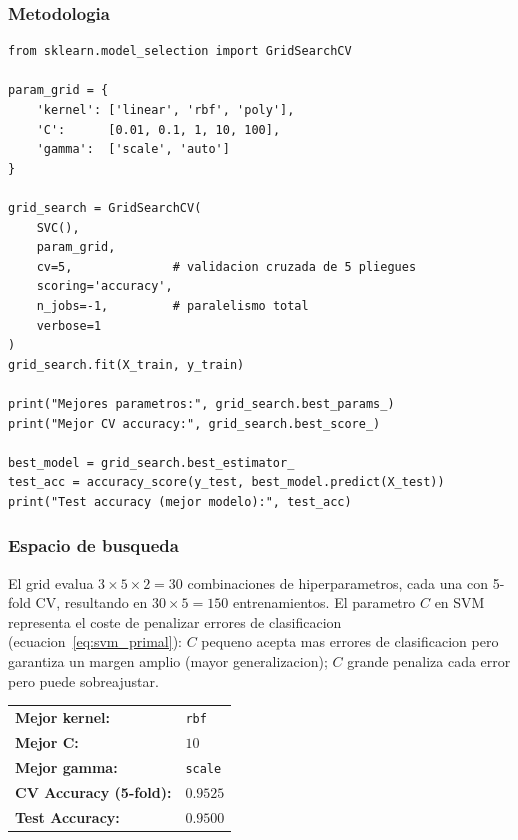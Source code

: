 \documentclass[12pt,a4paper]{article}
\begin{document}
\subsubsection*{Metodologia}

\begin{lstlisting}[caption={GridSearchCV para SVM}]
from sklearn.model_selection import GridSearchCV

param_grid = {
    'kernel': ['linear', 'rbf', 'poly'],
    'C':      [0.01, 0.1, 1, 10, 100],
    'gamma':  ['scale', 'auto']
}

grid_search = GridSearchCV(
    SVC(),
    param_grid,
    cv=5,              # validacion cruzada de 5 pliegues
    scoring='accuracy',
    n_jobs=-1,         # paralelismo total
    verbose=1
)
grid_search.fit(X_train, y_train)

print("Mejores parametros:", grid_search.best_params_)
print("Mejor CV accuracy:", grid_search.best_score_)

best_model = grid_search.best_estimator_
test_acc = accuracy_score(y_test, best_model.predict(X_test))
print("Test accuracy (mejor modelo):", test_acc)
\end{lstlisting}

\subsubsection*{Espacio de busqueda}

El grid evalua $3 \times 5 \times 2 = 30$ combinaciones de hiperparametros, cada una con 5-fold
CV, resultando en $30 \times 5 = 150$ entrenamientos. El parametro $C$ en SVM representa el
coste de penalizar errores de clasificacion (ecuacion~\ref{eq:svm_primal}): $C$ pequeno acepta
mas errores de clasificacion pero garantiza un margen amplio (mayor generalizacion); $C$ grande
penaliza cada error pero puede sobreajustar.

\begin{tcolorbox}[resultbox]
  \begin{tabular}{ll}
    \textbf{Mejor kernel:}   & \texttt{rbf}    \\[3pt]
    \textbf{Mejor C:}        & $10$            \\[3pt]
    \textbf{Mejor gamma:}    & \texttt{scale}  \\[3pt]
    \textbf{CV Accuracy (5-fold):} & $0.9525$   \\[3pt]
    \textbf{Test Accuracy:}  & $0.9500$        \\
  \end{tabular}
\end{tcolorbox}
\end{document}
